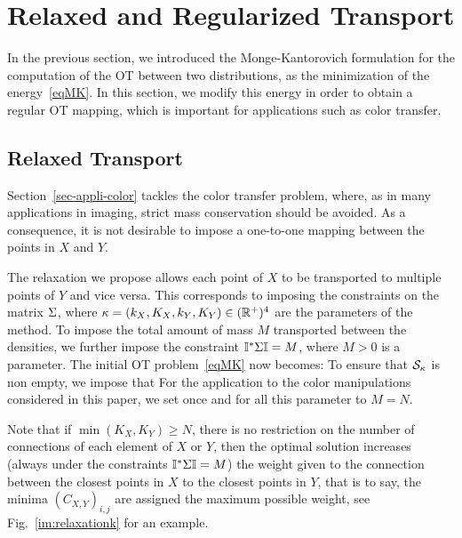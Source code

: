 \section{Relaxed and Regularized Transport}

In the previous section, we introduced the Monge-Kantorovich formulation for the computation of the OT between two distributions, as the minimization of the energy~\eqref{eqMK}. In this section, we modify this energy in order to obtain a regular OT mapping, which is important for applications such as color transfer. 

\subsection{Relaxed Transport}
\label{subsec-relaxed-transport}

Section~\ref{sec-appli-color} tackles the color transfer problem, where, as in many applications in imaging, strict mass conservation should be avoided.  As a consequence, it is not desirable to impose a one-to-one mapping between the points in $X$ and $Y$. 

The relaxation we propose allows each point of $X$ to be transported to multiple points of $Y$ and vice versa. This corresponds to imposing the constraints 
on the matrix $\Sigma$, where 
$\kappa=(k_X,K_X,k_Y,K_Y) \in (\mathbb{R}^+)^4$
are the parameters of the method. 
To impose the total amount of mass $M$ transported between the densities, we further impose the constraint $\mathbb{I}^* \Sigma\mathbb{I}=M$, where $M>0$ is a parameter.
The initial OT problem~\eqref{eqMK} now becomes:
To ensure that $\mathcal{S}_\kappa$ is non empty, we impose that
For the application to the color manipulations considered in this paper, we set once and for all this parameter to $M=N$. 

Note that if $\min(K_X,K_Y) \geq N$, there is no restriction on the number of connections of each element of $X$ or $Y$, then the optimal solution increases (always under the constraints $\mathbb{I}^*\Sigma\mathbb{I}=M$) the weight given to the connection between the closest points in $X$ to the closest points in $Y$, that is to say, the minima $(C_{X,Y})_{i,j}$ are assigned the maximum possible weight, see Fig.~\ref{im:relaxationk} for an example.  

